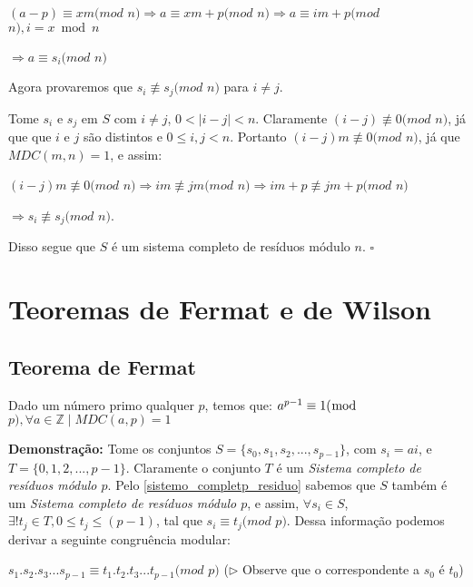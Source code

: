 $(a-p)\equiv xm(mod$ $n) \Rightarrow a\equiv xm+p(mod$ $n) \Rightarrow a\equiv im + p (mod$ $n), i=x\bmod n$

$\Rightarrow a\equiv s_i(mod$ $n)$

Agora provaremos que $s_i \not\equiv s_j (mod $ $n)$ para $i \neq j$.

Tome $s_i$ e $s_j$ em $S$ com $i\neq j$, $0 < |i-j| < n$. Claramente $(i-j)\not\equiv 0(mod$ $n)$, já que que $i$ e $j$ são distintos e $0 \leq i,j < n$.
Portanto $(i-j)m\not\equiv 0(mod$ $n)$, já que $MDC(m,n)=1$, e assim:

$(i-j)m\not\equiv 0(mod$ $n) \Rightarrow im \not\equiv jm(mod$ $n) \Rightarrow im+p \not\equiv jm+p(mod$ $n)$

$\Rightarrow s_i \not\equiv s_j(mod$ $n)$.

Disso segue que $S$ é um sistema completo de resíduos módulo $n$. $\square$



\section{Teoremas de Fermat e de Wilson}%

\subsection{Teorema de Fermat}

\begin{theorem}\label{teorema_fermat}
Dado um número primo qualquer $p$, temos que: 
$a^{p-1} \equiv 1 (\bmod$ $p), \forall a \in \mathbb{Z} \mid MDC(a, p) = 1$
\end{theorem}
\textbf{Demonstração:}
Tome os conjuntos $S = \{s_0, s_1, s_2, ..., s_{p-1}\}$, com $s_i = ai$, e $T = \{0, 1, 2,..., p-1\}$. 
Claramente o conjunto $T$ é um \textit{Sistema completo de resíduos módulo $p$}.
Pelo \autoref{sistemo_completp_residuo} sabemos que $S$ também é um \textit{Sistema completo de resíduos módulo $p$},
e assim, $\forall s_i\in S$, $\exists! t_j\in T, 0\leq t_j\leq(p-1)$, tal que $s_i\equiv t_j(mod$ $p)$. Dessa informação podemos derivar a seguinte congruência modular:

$s_1.s_2.s_3...s_{p-1} \equiv t_1.t_2.t_3...t_{p-1} (mod$ $p)$ ($\triangleright$ Observe que o correspondente a $s_0$ é $t_0$)

